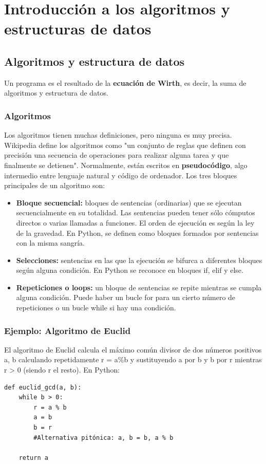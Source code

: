 \chapter{Introducción a los algoritmos y estructuras de datos}
\section{Algoritmos y estructura de datos}
Un programa es el resultado de la \textbf{ecuación de Wirth}, es decir, la suma de algoritmos y estructura de datos.

\subsection{Algoritmos}
Los algoritmos tienen muchas definiciones, pero ninguna es muy precisa. Wikipedia define los algoritmos como "un conjunto de reglas que definen con precisión una secuencia de operaciones para realizar alguna tarea y que finalmente se detienen". Normalmente, están escritos en \textbf{pseudocódigo}, algo intermedio entre lenguaje natural y código de ordenador. Los tres bloques principales de un algoritmo son:
\begin{itemize}
\item \textbf{Bloque secuencial:} bloques de sentencias (ordinarias) que se ejecutan secuencialmente en su totalidad. Las sentencias pueden tener sólo cómputos directos o varias llamadas a funciones. El orden de ejecución es según la ley de la gravedad. En Python, se definen como bloques formados por sentencias con la misma sangría.
\item \textbf{Selecciones:} sentencias en las que la ejecución se bifurca a diferentes bloques según alguna condición. En Python se reconoce en bloques if, elif y else.
\item \textbf{Repeticiones o loops:} un bloque de sentencias se repite mientras se cumpla alguna condición. Puede haber un bucle for para un cierto número de repeticiones o un bucle while si hay una condición.
\end{itemize}

\subsection{Ejemplo: Algoritmo de Euclid}
El algoritmo de Euclid calcula el máximo común divisor de dos números positivos a, b calculando repetidamente r = a\%b y sustituyendo a por b y b por r mientras r > 0 (siendo r el resto). En Python:
\begin{lstlisting}
def euclid_gcd(a, b):
	while b > 0:
		r = a % b
		a = b
		b = r
		#Alternativa pitónica: a, b = b, a % b
		
	return a
\end{lstlisting}

